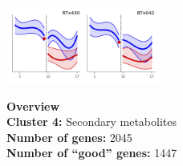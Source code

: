 \begin{multicols}{2}
\includegraphics[width=2in]{figures/clusters/root_Postflowering_3.png}
\columnbreak

\noindent \textbf{Overview}\\\textbf{Cluster 4:} Secondary metabolites \\
\textbf{Number of genes:} 2045 \\
\textbf{Number of ``good'' genes:} 1447 \\
\end{multicols}

